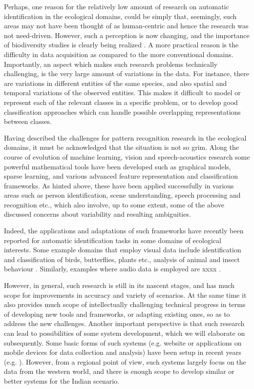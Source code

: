 \documentclass{article}
\begin{document}
Perhaps, one reason for the relatively low amount of research on automatic identification in the ecological domains, could be simply that, seemingly, such areas may not have been thought of as human-centric and hence the research was not need-driven. However, such a perception is now changing, and the importance of biodiversity studies is clearly being realized \cite{}. A more practical reason is the difficulty in data acquisition as compared to the more conventional domains. Importantly, an aspect which makes such research problems technically challenging, is the very large amount of variations in the data. For instance, there are variations in different entities of the same species, and also spatial and temporal variations of the observed entities. This makes it difficult to model or represent each of the relevant classes in a specific problem, or to develop good classification approaches which can handle possible overlapping representations between classes.

Having described the challenges for pattern recognition research in the ecological domains, it must be acknowledged that the situation is not so grim. Along the course of evolution of machine learning, vision and speech-acoustics research some powerful mathematical tools have been developed such as graphical models, sparse learning, and various advanced feature representation and classification frameworks. 
As hinted above, these have been applied successfully in various areas such as person identification, scene understanding, speech processing and recognition etc., which also involve, up to some extent, some of the above discussed concerns about variability and resulting ambiguities. 

Indeed, the applications and adaptations of such frameworks have recently been reported for automatic identification tasks in some domains of ecological interests. Some example domains that employ visual data include identification and classification of birds, butterflies, plants etc., analysis of animal and insect behaviour \cite{leaf,butterfly,hierarchy,poof}. Similarly, examples where audio data is employed are xxxx \cite{}.

However, in general, such research is still in its nascent stages, and has much scope for improvements in accuracy and variety of scenarios. At the same time it also provides much scope of intellectually challenging technical progress in terms of developing new tools and frameworks, or adapting existing ones, so as to address the new challenges. Another important perspective is that such research can lead to possibilities of some system development, which we will elaborate on subsequently. Some basic forms of such systems (e.g. website or applications on mobile devices for data collection and analysis) have been setup in recent years (e.g. \cite{birdsnap}). However, from a regional point of view, such systems largely focus on the data from the western world, and there is enough scope to develop similar or better systems for the Indian scenario. 
\end{document}
